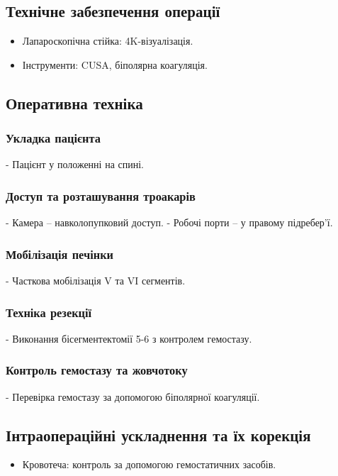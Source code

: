 \begin{refsection}
\subsection{Технічне забезпечення операції}
\begin{itemize}
    \item Лапароскопічна стійка: 4K-візуалізація.
    \item Інструменти: CUSA, біполярна коагуляція.
\end{itemize}

\subsection{Оперативна техніка}
\subsubsection{Укладка пацієнта}
- Пацієнт у положенні на спині.

\subsubsection{Доступ та розташування троакарів}
- Камера – навколопупковий доступ.
- Робочі порти – у правому підребер'ї.

\subsubsection{Мобілізація печінки}
- Часткова мобілізація V та VI сегментів.

\subsubsection{Техніка резекції}
- Виконання бісегментектомії 5-6 з контролем гемостазу.

\subsubsection{Контроль гемостазу та жовчотоку}
- Перевірка гемостазу за допомогою біполярної коагуляції.

\subsection{Інтраопераційні ускладнення та їх корекція}
\begin{itemize}
    \item Кровотеча: контроль за допомогою гемостатичних засобів.
\end{itemize}


\end{refsection}

